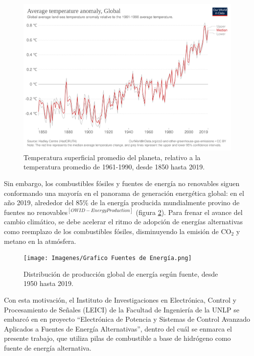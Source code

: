 \begin{figure}[H]
    \centering
    \includegraphics[scale=0.11]{Imagenes/Grafico Temperatura.png}
    \caption{Temperatura superficial promedio del planeta, relativo a la temperatura promedio de 1961-1990, desde 1850 hasta 2019.}
    \label{Temp_Tierra}
\end{figure}

Sin embargo, los combustibles fósiles y fuentes de energía no renovables siguen conformando una mayoría en el panorama de generación energética global: en el año 2019, alrededor del 85\% de la energía producida mundialmente provino de fuentes no renovables$^{[OWID-EnergyProduction]}$ (figura \ref{Emisiones_CO2}). Para frenar el avance del cambio climático, se debe acelerar el ritmo de adopción de energías alternativas como reemplazo de los combustibles fósiles, disminuyendo la emisión de CO$_2$ y metano en la atmósfera.

\begin{figure}[H]
    \centering
    \texttt{[image: Imagenes/Grafico Fuentes de Energía.png]}
    \caption{Distribución de producción global de energía según fuente, desde 1950 hasta 2019.}
    \label{Emisiones_CO2}
\end{figure}

Con esta motivación, el Instituto de Investigaciones en Electrónica, Control y Procesamiento de Señales (LEICI) de la Facultad de Ingeniería de la UNLP se embarcó en en proyecto ``Electrónica de Potencia y Sistemas de Control Avanzado Aplicados a Fuentes de Energía Alternativas'', dentro del cuál se enmarca el presente trabajo, que utiliza pilas de combustible a base de hidrógeno como fuente de energía alternativa.\\

